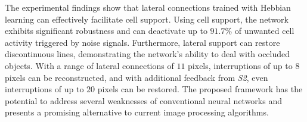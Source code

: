 The experimental findings show that lateral connections trained with Hebbian learning can effectively facilitate cell support.
Using cell support, the network exhibits significant robustness and can deactivate up to $91.7\%$ of unwanted cell activity triggered by noise signals. Furthermore, lateral support can restore discontinuous lines, demonstrating the network's ability to deal with occluded objects. With a range of lateral connections of $11$ pixels, interruptions of up to $8$ pixels can be reconstructed, and with additional feedback from \emph{S2}, even interruptions of up to $20$ pixels can be restored. The proposed framework has the potential to address several weaknesses of conventional neural networks and presents a promising alternative to current image processing algorithms.